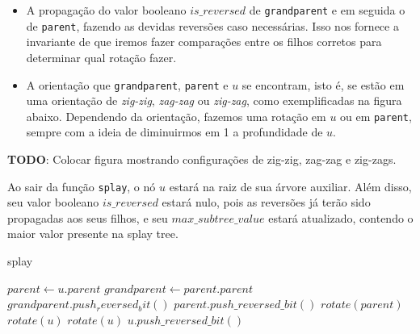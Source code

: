 \begin{itemize}
    \item A propagação do valor booleano $is\_reversed$ de \texttt{grandparent} e em seguida o de \texttt{parent}, fazendo as devidas reversões caso necessárias. Isso nos fornece a invariante de que iremos fazer comparações entre os filhos corretos para determinar qual rotação fazer.
    \item A orientação que \texttt{grandparent}, \texttt{parent} e $u$ se encontram, isto é, se estão em uma orientação de \textit{zig-zig}, \textit{zag-zag} ou \textit{zig-zag}, como exemplificadas na figura abaixo. Dependendo da orientação, fazemos uma rotação em $u$ ou em \texttt{parent}, sempre com a ideia de diminuirmos em 1 a profundidade de $u$.
\end{itemize}

\begin{center}
    \textbf{TODO}: Colocar figura mostrando configurações de zig-zig, zag-zag e zig-zags.
\end{center}

Ao sair da função \texttt{splay}, o nó $u$ estará na raiz de sua árvore auxiliar. Além disso, seu valor booleano $is\_reversed$ estará nulo, pois as reversões já terão sido propagadas aos seus filhos, e seu $max\_subtree\_value$ estará atualizado, contendo o maior valor presente na splay tree.

\begin{algorithm}[h!]
    \caption{splay}\label{splay:splay}
    \begin{algorithmic}
         
        \State $parent \gets u.parent$
        \State $grandparent \gets parent.parent$
        \State $grandparent.push_reversed_bit()$
        \State $parent.push\_reversed\_bit()$
        \State $rotate(parent)$
        \Else
        \State $rotate(u)$
        \EndIf
        \EndIf
        \State $rotate(u)$
        \EndWhile
        \State $u.push\_reversed\_bit()$
        \EndFunction
    \end{algorithmic}
\end{algorithm}

